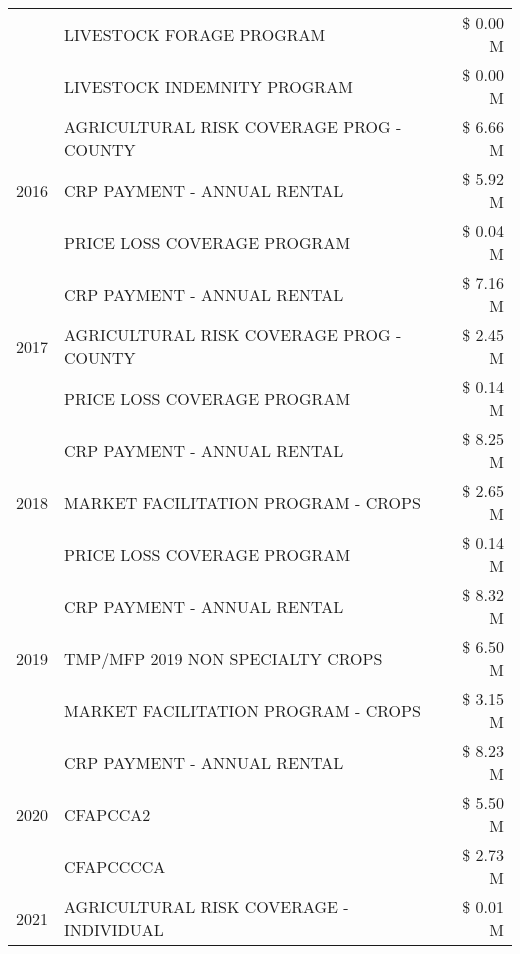 \begin{tabular}{llr}
 & LIVESTOCK FORAGE PROGRAM & \$ 0.00 M \\
 & LIVESTOCK INDEMNITY PROGRAM & \$ 0.00 M \\
\cline{1-3}
\multirow[t]{3}{*}{2016} & AGRICULTURAL RISK COVERAGE PROG - COUNTY & \$ 6.66 M \\
 & CRP PAYMENT - ANNUAL RENTAL & \$ 5.92 M \\
 & PRICE LOSS COVERAGE PROGRAM & \$ 0.04 M \\
\cline{1-3}
\multirow[t]{3}{*}{2017} & CRP PAYMENT - ANNUAL RENTAL & \$ 7.16 M \\
 & AGRICULTURAL RISK COVERAGE PROG - COUNTY & \$ 2.45 M \\
 & PRICE LOSS COVERAGE PROGRAM & \$ 0.14 M \\
\cline{1-3}
\multirow[t]{3}{*}{2018} & CRP PAYMENT - ANNUAL RENTAL & \$ 8.25 M \\
 & MARKET FACILITATION PROGRAM - CROPS & \$ 2.65 M \\
 & PRICE LOSS COVERAGE PROGRAM & \$ 0.14 M \\
\cline{1-3}
\multirow[t]{3}{*}{2019} & CRP PAYMENT - ANNUAL RENTAL & \$ 8.32 M \\
 & TMP/MFP 2019 NON SPECIALTY CROPS & \$ 6.50 M \\
 & MARKET FACILITATION PROGRAM - CROPS & \$ 3.15 M \\
\cline{1-3}
\multirow[t]{3}{*}{2020} & CRP PAYMENT - ANNUAL RENTAL & \$ 8.23 M \\
 & CFAPCCA2 & \$ 5.50 M \\
 & CFAPCCCCA & \$ 2.73 M \\
\cline{1-3}
2021 & AGRICULTURAL RISK COVERAGE - INDIVIDUAL & \$ 0.01 M \\
\cline{1-3}
\bottomrule
\end{tabular}
